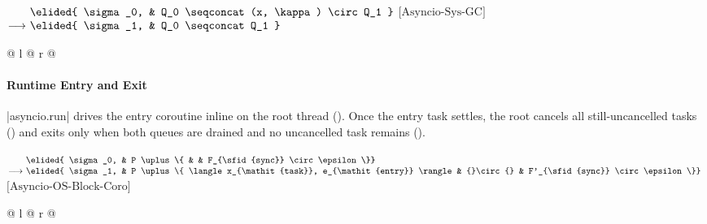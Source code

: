 \vspace{1em}
\noindent
$\begin{array}[t]{@{}r@{\ }l@{\ }l@{}}
                & \elided{ \sigma_0, & Q_0 \seqconcat (x, \kappa) \circ Q_1 } \\
\longrightarrow & \elided{ \sigma_1, & Q_0 \seqconcat Q_1 }
\end{array}$\hfill$\text{[Asyncio-Sys-GC]}$\par
\noindent
\begin{tabular*}{\linewidth}{@{} l @{\extracolsep{\fill}} r @{}}
\end{tabular*}

\vspace{1em}
\paragraph{Runtime Entry and Exit}
\code|asyncio.run| drives the entry coroutine inline on the root thread (). Once the entry task settles, the root cancels all still-uncancelled tasks () and exits only when both queues are drained and no uncancelled task remains ().

\noindent
$\begin{array}[t]{@{}r@{\ }l@{\ }l@{}l@{}l@{}}
                & \elided{ \sigma_0, & P \uplus \{ & & F_{\sfid{sync}} \circ \epsilon \}} \\
\longrightarrow & \elided{ \sigma_1, & P \uplus \{ \langle x_{\mathit{task}}, e_{\mathit{entry}} \rangle & {}\circ{} & F'_{\sfid{sync}} \circ \epsilon \}}
\end{array}$\hfill$\text{[Asyncio-OS-Block-Coro]}$\par
\noindent
\begin{tabular*}{\linewidth}{@{} l @{\extracolsep{\fill}} r @{}}
\end{tabular*}

